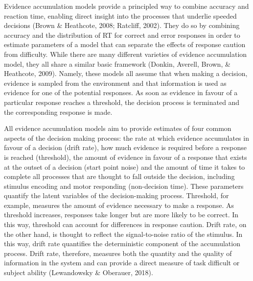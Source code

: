 \documentclass[
  man, donotrepeattitle,floatsintext]{apa6}
\begin{document}
Evidence accumulation models provide a principled way to combine accuracy and reaction time, enabling direct insight into the processes that underlie speeded decisions (Brown \& Heathcote, 2008; Ratcliff, 2002). They do so by combining accuracy and the distribution of RT for correct and error responses in order to estimate parameters of a model that can separate the effects of response caution from difficulty. While there are many different varieties of evidence accumulation model, they all share a similar basic framework (Donkin, Averell, Brown, \& Heathcote, 2009). Namely, these models all assume that when making a decision, evidence is sampled from the environment and that information is used as evidence for one of the potential responses. As soon as evidence in favour of a particular response reaches a threshold, the decision process is terminated and the corresponding response is made.

All evidence accumulation models aim to provide estimates of four common aspects of the decision making process: the rate at which evidence accumulates in favour of a decision (drift rate), how much evidence is required before a response is reached (threshold), the amount of evidence in favour of a response that exists at the outset of a decision (start point noise) and the amount of time it takes to complete all processes that are thought to fall outside the decision, including stimulus encoding and motor responding (non-decision time). These parameters quantify the latent variables of the decision-making process. Threshold, for example, measures the amount of evidence necessary to make a response. As threshold increases, responses take longer but are more likely to be correct. In this way, threshold can account for differences in response caution. Drift rate, on the other hand, is thought to reflect the signal-to-noise ratio of the stimulus. In this way, drift rate quantifies the deterministic component of the accumulation process. Drift rate, therefore, measures both the quantity and the quality of information in the system and can provide a direct measure of task difficult or subject ability (Lewandowsky \& Oberauer, 2018).
\end{document}

